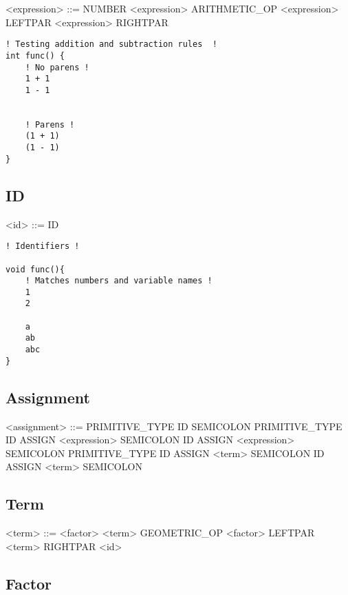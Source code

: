 \documentclass{article}
\begin{document}
\begin{grammar}

<expression> ::= NUMBER
\alt <expression> ARITHMETIC\_OP <expression> 
\alt LEFTPAR <expression> RIGHTPAR

\end{grammar}

\begin{lstlisting}[style=CStyle]
! Testing addition and subtraction rules  !
int func() {
    ! No parens !
    1 + 1
    1 - 1


    ! Parens !
    (1 + 1)
    (1 - 1)
}
\end{lstlisting}

\subsection{ID}

\begin{grammar}
<id> ::= ID
\end{grammar}

\begin{lstlisting}[style=CStyle]
! Identifiers !

void func(){
    ! Matches numbers and variable names !
    1
    2

    a
    ab
    abc
}

\end{lstlisting}

\subsection{Assignment}

\begin{grammar}
<assignment> ::= PRIMITIVE\_TYPE ID SEMICOLON
\alt PRIMITIVE\_TYPE ID ASSIGN <expression> SEMICOLON
\alt ID ASSIGN <expression> SEMICOLON
\alt PRIMITIVE\_TYPE ID ASSIGN <term> SEMICOLON
\alt ID ASSIGN <term> SEMICOLON
\end{grammar}

\subsection{Term}

\begin{grammar}
<term> ::= <factor>
\alt <term> GEOMETRIC\_OP <factor>
\alt LEFTPAR <term> RIGHTPAR
\alt <id>
\end{grammar}

\subsection{Factor}
\end{document}
